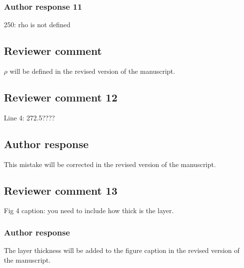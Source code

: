 \documentclass[11pt]{scrartcl}
\begin{document}
\subsubsection*{Author response 11}
250: rho is not defined

\subsection*{Reviewer comment}

$\rho$ will be defined in the revised version of the manuscript.


\subsection*{Reviewer comment 12}
Line 4: 272.5????

\subsection*{Author response}
This mistake will be corrected in the revised version of the manuscript.

\subsection*{Reviewer comment 13}
Fig 4 caption: you need to include how thick is the layer.

\subsubsection*{Author response}
The layer thickness will be added to the figure caption in the revised version
of the manuscript.



\end{document}
